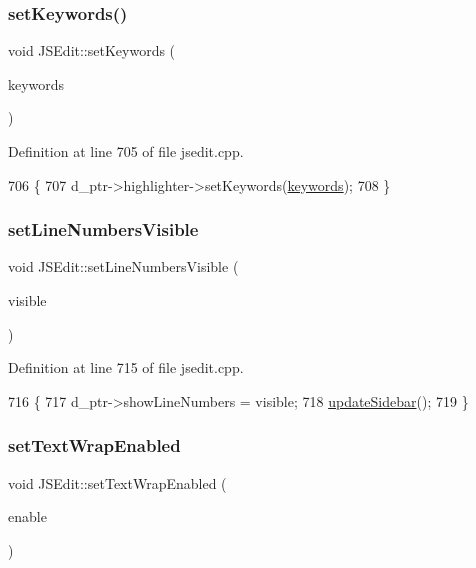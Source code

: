 \subsubsection{\texorpdfstring{set\+Keywords()}{setKeywords()}}
{\footnotesize\ttfamily void J\+S\+Edit\+::set\+Keywords (\begin{DoxyParamCaption}\item[{const Q\+String\+List \&}]{keywords }\end{DoxyParamCaption})}



Definition at line 705 of file jsedit.\+cpp.


\begin{DoxyCode}
706 \{
707     d\_ptr->highlighter->setKeywords(\hyperlink{class_j_s_edit_af2a11c0f985403c3cf42143151688500}{keywords});
708 \}
\end{DoxyCode}
\mbox{\label{class_j_s_edit_aa4ebbca83d75bf65bd715f162d010e35}} 
\subsubsection{\texorpdfstring{set\+Line\+Numbers\+Visible}{setLineNumbersVisible}}
{\footnotesize\ttfamily void J\+S\+Edit\+::set\+Line\+Numbers\+Visible (\begin{DoxyParamCaption}\item[{bool}]{visible }\end{DoxyParamCaption})\hspace{0.3cm}{\ttfamily [slot]}}



Definition at line 715 of file jsedit.\+cpp.


\begin{DoxyCode}
716 \{
717     d\_ptr->showLineNumbers = visible;
718     \hyperlink{class_j_s_edit_ac51a3a9f7b1e8c5bc98b345bfc3d3b53}{updateSidebar}();
719 \}
\end{DoxyCode}
\mbox{\label{class_j_s_edit_a4af6d6926d0f98c36432ba44bb080f8d}} 
\subsubsection{\texorpdfstring{set\+Text\+Wrap\+Enabled}{setTextWrapEnabled}}
{\footnotesize\ttfamily void J\+S\+Edit\+::set\+Text\+Wrap\+Enabled (\begin{DoxyParamCaption}\item[{bool}]{enable }\end{DoxyParamCaption})\hspace{0.3cm}{\ttfamily [slot]}}



